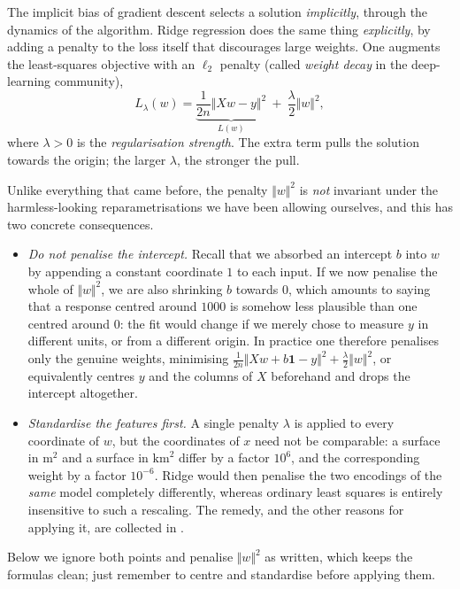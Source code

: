 The implicit bias of gradient descent selects a solution \emph{implicitly}, through
the dynamics of the algorithm. Ridge regression does the same thing
\emph{explicitly}, by adding a penalty to the loss itself that discourages large
weights. One augments the least-squares objective with an $\ell_2$ penalty (called
\emph{weight decay} in the deep-learning community),
\[
L_\lambda(w) = \underbrace{\frac{1}{2n}\Vert X w - y \Vert^2}_{L(w)}
\ + \ \frac{\lambda}{2}\Vert w \Vert^2 ,
\]
where $\lambda > 0$ is the \emph{regularisation strength}. The extra term pulls the
solution towards the origin; the larger $\lambda$, the stronger the pull.

\begin{remark}
Unlike everything that came before, the penalty $\Vert w \Vert^2$ is \emph{not}
invariant under the harmless-looking reparametrisations we have been allowing
ourselves, and this has two concrete consequences.
\begin{itemize}
    \item \emph{Do not penalise the intercept.} Recall that we absorbed an intercept
    $b$ into $w$ by appending a constant coordinate $1$ to each input. If we now
    penalise the whole of $\Vert w \Vert^2$, we are also shrinking $b$ towards $0$,
    which amounts to saying that a response centred around $1000$ is somehow less
    plausible than one centred around $0$: the fit would change if we merely chose to
    measure $y$ in different units, or from a different origin. In practice one
    therefore penalises only the genuine weights, minimising
    $\tfrac{1}{2n}\Vert Xw + b\mathbf{1} - y\Vert^2 + \tfrac{\lambda}{2}\Vert w\Vert^2$,
    or equivalently centres $y$ and the columns of $X$ beforehand and drops the
    intercept altogether.
    \item \emph{Standardise the features first.} A single penalty $\lambda$ is applied
    to every coordinate of $w$, but the coordinates of $x$ need not be comparable: a
    surface in $\text{m}^2$ and a surface in $\text{km}^2$ differ by a factor $10^6$,
    and the corresponding weight by a factor $10^{-6}$. Ridge would then penalise the
    two encodings of the \emph{same} model completely differently, whereas ordinary
    least squares is entirely insensitive to such a rescaling. The remedy, and the
    other reasons for applying it, are collected in .
\end{itemize}
Below we ignore both points and penalise $\Vert w \Vert^2$ as written, which keeps
the formulas clean; just remember to centre and standardise before applying them.
\end{remark}

